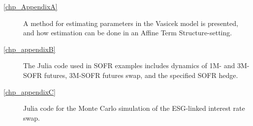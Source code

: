 \begin{description}
    \item[\cref{chp_AppendixA}]
    A method for estimating parameters in the Vasicek model is presented, and how estimation can be done in an Affine Term Structure-setting. 

    \item [\cref{chp_appendixB}]
    The Julia code used in SOFR examples includes dynamics of 1M- and 3M-SOFR futures, 3M-SOFR futures swap, and the specified SOFR hedge. 

    \item [\cref{chp_appendixC}]
    Julia code for the Monte Carlo simulation of the ESG-linked interest rate swap. 
    
        
\begin{comment}
    \item[\cref{intro}] consists of an interesting introduction. Zooming in on your research question, taking history into account and clarify what your problem is. You could consider calling this a part if you have multiple result parts in your thesis. It ends with an outline.
    \item[\cref{background}] is all about the theoretical background, methods and notation. Don't forget a description of data. 
    \item[\cref{results}] is all about your results. It could be theorems and proofs, it could be applications, it could be examples.
    \item[\cref{discussion}] is more about your results; in subjects that follow the IMRaD-structure, it is known as \enquote{discussion}. Put your results in context. Expand, explain and compare. Weaknesses and strengths of your results. Synergy effects from your results?  Perhaps this chapter is not not relevant for you.
    \item[\cref{conc}] is your fabulous conclusion. Summing up what you have done. Focus on your contribution and repeat how your results make the world a better place. Point to future reseach.
    \item At the end of the thesis, you include short appendices with code, pseudocode, large tables, more examples or figures. See \cref{sec:first-app} and \cref{sec:second-app}. If the length of your appendices is disproportional to the length of your text, consider making it available online with a permanent DOI (Digital Object Identifier), e.g., online repositories like GitHub, Zenodo etc. This will help your future readers and your research group immensely.
\end{comment}
\end{description}
